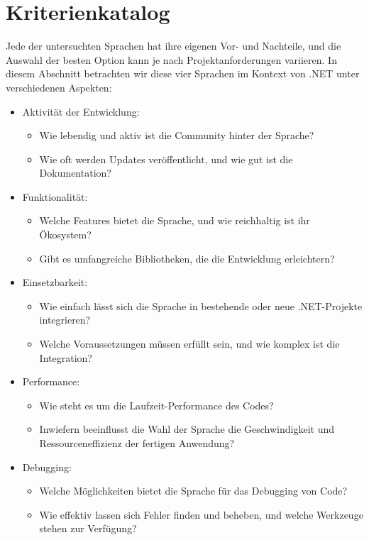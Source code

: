 \newpage
\section{Kriterienkatalog}
Jede der untersuchten Sprachen hat ihre eigenen Vor- und Nachteile, und die Auswahl der besten Option kann je nach Projektanforderungen variieren. 
In diesem Abschnitt betrachten wir diese vier Sprachen im Kontext von .NET unter verschiedenen Aspekten:

\begin{itemize}
    \item Aktivität der Entwicklung: 
    \begin{itemize}
        \item Wie lebendig und aktiv ist die Community hinter der Sprache? 
        \item Wie oft werden Updates veröffentlicht, und wie gut ist die Dokumentation?
    \end{itemize}
    \item Funktionalität:
    \begin{itemize}
        \item Welche Features bietet die Sprache, und wie reichhaltig ist ihr Ökosystem? 
        \item Gibt es umfangreiche Bibliotheken, die die Entwicklung erleichtern?
    \end{itemize}
    \item Einsetzbarkeit:
    \begin{itemize}
        \item Wie einfach lässt sich die Sprache in bestehende oder neue .NET-Projekte integrieren?
        \item Welche Voraussetzungen müssen erfüllt sein, und wie komplex ist die Integration?
    \end{itemize}
    \item Performance:
    \begin{itemize}
        \item Wie steht es um die Laufzeit-Performance des Codes? 
        \item  Inwiefern beeinflusst die Wahl der Sprache die Geschwindigkeit und Ressourceneffizienz der fertigen Anwendung?
    \end{itemize}
    \item Debugging:
    \begin{itemize}
        \item Welche Möglichkeiten bietet die Sprache für das Debugging von Code?
        \item Wie effektiv lassen sich Fehler finden und beheben, und welche Werkzeuge stehen zur Verfügung?
    \end{itemize}
\end{itemize}

